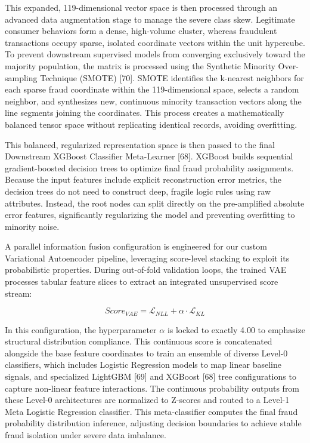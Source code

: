\documentclass[11pt,a4paper]{report}
\begin{document}
This expanded, 119-dimensional vector space is then processed through an advanced data augmentation stage to manage the severe class skew. Legitimate consumer behaviors form a dense, high-volume cluster, whereas fraudulent transactions occupy sparse, isolated coordinate vectors within the unit hypercube. To prevent downstream supervised models from converging exclusively toward the majority population, the matrix is processed using the Synthetic Minority Over-sampling Technique (SMOTE) [70]. SMOTE identifies the k-nearest neighbors for each sparse fraud coordinate within the 119-dimensional space, selects a random neighbor, and synthesizes new, continuous minority transaction vectors along the line segments joining the coordinates. This process creates a mathematically balanced tensor space without replicating identical records, avoiding overfitting. 

This balanced, regularized representation space is then passed to the final Downstream XGBoost Classifier Meta-Learner [68]. XGBoost builds sequential gradient-boosted decision trees to optimize final fraud probability assignments. Because the input features include explicit reconstruction error metrics, the decision trees do not need to construct deep, fragile logic rules using raw attributes. Instead, the root nodes can split directly on the pre-amplified absolute error features, significantly regularizing the model and preventing overfitting to minority noise.

A parallel information fusion configuration is engineered for our custom Variational Autoencoder pipeline, leveraging score-level stacking to exploit its probabilistic properties. During out-of-fold validation loops, the trained VAE processes tabular feature slices to extract an integrated unsupervised score stream:

\begin{equation}
Score_{VAE}=\mathcal{L}_{NLL}+\alpha\cdot\mathcal{L}_{KL}
\end{equation}

In this configuration, the hyperparameter $\alpha$ is locked to exactly 4.00 to emphasize structural distribution compliance. This continuous score is concatenated alongside the base feature coordinates to train an ensemble of diverse Level-0 classifiers, which includes Logistic Regression models to map linear baseline signals, and specialized LightGBM [69] and XGBoost [68] tree configurations to capture non-linear feature interactions. The continuous probability outputs from these Level-0 architectures are normalized to Z-scores and routed to a Level-1 Meta Logistic Regression classifier. This meta-classifier computes the final fraud probability distribution inference, adjusting decision boundaries to achieve stable fraud isolation under severe data imbalance.
\end{document}
